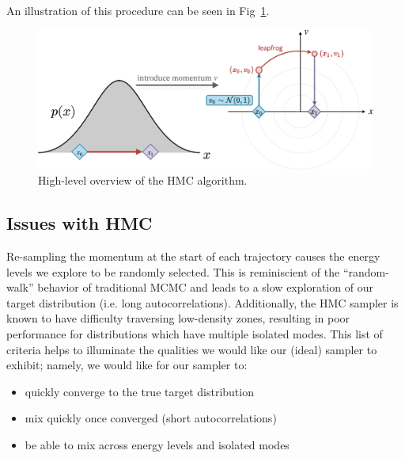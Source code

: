 \documentclass[a4paper,11pt]{article}
\begin{document}
%
An illustration of this procedure can be seen in Fig~\ref{fig:hmc}.
%
\begin{figure}[htpb]
    \centering
    \includegraphics[width=\textwidth]{assets/hmc.pdf}
    \caption{\label{fig:hmc}High-level overview of the HMC algorithm.}
\end{figure}
%
\subsection{\label{subsec:hmc_issues}Issues with HMC}
%
Re-sampling the momentum at the start of each trajectory causes the energy
levels we explore to be randomly selected.
%
This is reminiscient of the ``random-walk'' behavior of traditional MCMC and
leads to a slow exploration of our target distribution (i.e. long
autocorrelations).
%
%
Additionally, the HMC sampler is known to have difficulty traversing
low-density zones, resulting in poor performance for distributions which have
multiple isolated modes.
%
This list of criteria helps to illuminate the qualities we would like our
(ideal) sampler to exhibit; namely, we would like for our sampler to: 
%
%
\begin{itemize}
    \item quickly converge to the true target distribution
    \item mix quickly once converged (short autocorrelations)
    \item be able to mix across energy levels and isolated modes
\end{itemize}
%
\end{document}
